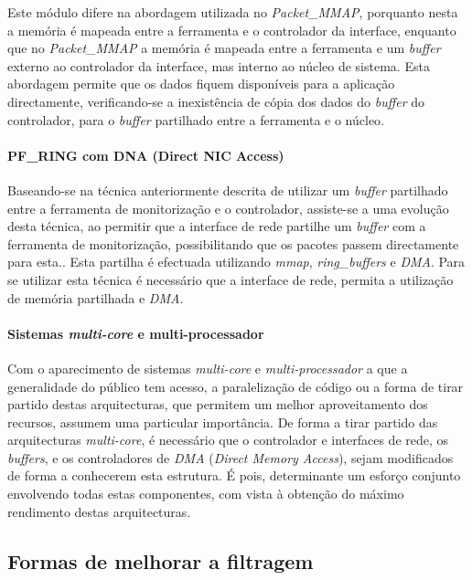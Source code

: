 Este módulo difere na abordagem utilizada no \textit{Packet\_MMAP}, porquanto nesta a memória é mapeada entre a ferramenta e o controlador da interface, enquanto que no \textit{Packet\_MMAP} a memória é mapeada entre a ferramenta e um \textit{buffer} externo ao controlador da interface, mas interno ao núcleo de sistema.
Esta abordagem permite que os dados fiquem disponíveis para a aplicação directamente, verificando-se a inexistência de cópia dos dados do \textit{buffer} do controlador, para o \textit{buffer} partilhado entre a ferramenta e o núcleo\cite{:PF_RING}.
 
\paragraph*{PF\_RING com DNA (Direct NIC Access)}
Baseando-se na técnica anteriormente descrita de utilizar um \textit{buffer} partilhado entre a ferramenta de monitorização e o controlador, assiste-se a uma evolução desta técnica, ao permitir que a interface de rede partilhe um \textit{buffer} com a ferramenta de monitorização, possibilitando que os pacotes passem directamente para esta.\cite{:IntroPF_RIDNADirecNICAcces}.
Esta partilha é efectuada utilizando \textit{mmap}, \textit{ring\_buffers} e \textit{DMA}.
Para se utilizar esta técnica é necessário que a interface de rede, permita a utilização de memória partilhada e \textit{DMA}.

\paragraph*{Sistemas \textit{multi-core} e multi-processador}

Com o aparecimento de sistemas \textit{multi-core} e \textit{multi-processador} a que a generalidade do público tem acesso, a paralelização de código ou a forma de tirar partido destas arquitecturas, que permitem um melhor aproveitamento dos recursos, assumem uma particular importância.
De forma a tirar partido das arquitecturas \textit{multi-core}, é necessário que o controlador e interfaces de rede, os \textit{buffers}, e os controladores de \textit{DMA} (\textit{Direct Memory Access}), sejam modificados de forma a conhecerem esta estrutura.
É pois, determinante um esforço conjunto envolvendo todas estas componentes, com vista à obtenção do máximo rendimento destas arquitecturas\cite{Deri:2010}.

\subsection{Formas de melhorar a filtragem}
 
